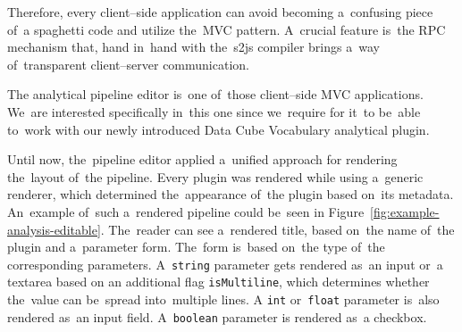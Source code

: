 Therefore, every client--side application can avoid becoming a~confusing piece of~a
spaghetti code and utilize the~MVC pattern. A~crucial feature is~the RPC 
mechanism that, hand in~hand with the~s2js compiler brings a~way of~transparent 
client--server communication.

The analytical pipeline editor is~one of~those client--side MVC applications. We~are interested specifically in~this one since we~require for it~to be~able to~work 
with our newly introduced Data Cube Vocabulary analytical plugin.

Until now, the~pipeline editor applied a~unified approach for rendering the~layout of~the pipeline. Every plugin was rendered while using a~generic 
renderer, which determined the~appearance of~the plugin based on~its metadata. An~example of~such a~rendered pipeline could be~seen in
Figure~\ref{fig:example-analysis-editable}. The~reader can see a~rendered title, based on~the name of~the plugin and a~parameter form. The~form is~based on~the type of~the 
corresponding parameters. A~\texttt{string} parameter gets rendered as~an input or~a textarea based on
an additional flag \texttt{isMultiline}, which determines whether the~value can be~spread into~multiple lines.
A \texttt{int} or~\texttt{float} parameter is~also rendered as~an input field. A~\texttt{boolean} parameter 
is rendered as~a checkbox.

